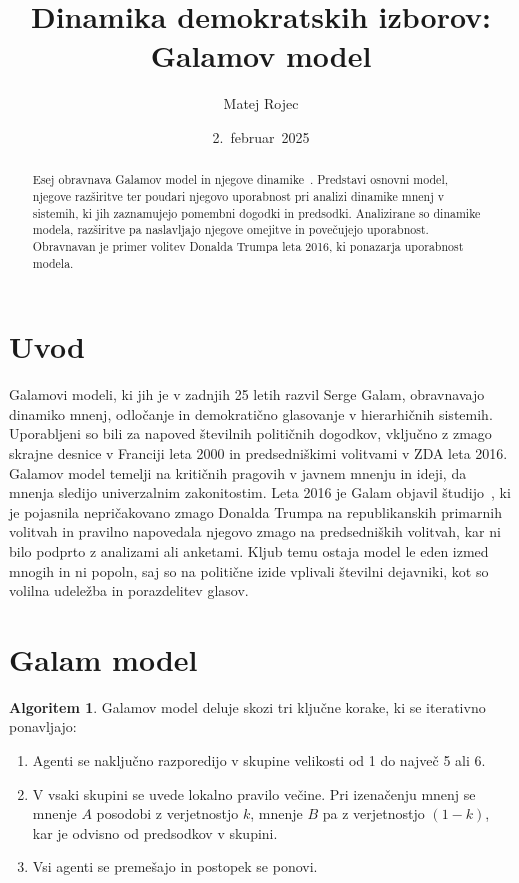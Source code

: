 \documentclass[a4paper,12pt]{article}
\theoremstyle{definition}
\newtheorem{algoritem}{Algoritem}
\begin{document}
\title{Dinamika demokratskih izborov: Galamov model}
\author{Matej Rojec}
\date{2.~februar~2025}

\maketitle

\begin{abstract}
Esej obravnava Galamov model in njegove dinamike~\cite{galam2015stubbornness,galam2016trump,galam2020tipping}. 
Predstavi osnovni model, njegove razširitve ter poudari njegovo uporabnost pri 
analizi dinamike mnenj v sistemih, ki jih zaznamujejo pomembni dogodki in predsodki. 
Analizirane so dinamike modela, razširitve pa naslavljajo njegove omejitve in 
povečujejo uporabnost. Obravnavan je primer volitev Donalda Trumpa leta 2016, 
ki ponazarja uporabnost modela.
\end{abstract}

\section{Uvod}

Galamovi modeli, ki jih je v zadnjih 25 letih razvil Serge Galam, obravnavajo dinamiko mnenj, 
odločanje in demokratično glasovanje v hierarhičnih sistemih. 
Uporabljeni so bili za napoved številnih političnih dogodkov, vključno z zmago skrajne desnice 
v Franciji leta 2000 in predsedniškimi volitvami v ZDA leta 2016. Galamov model temelji na 
kritičnih pragovih v javnem mnenju in ideji, da mnenja sledijo univerzalnim zakonitostim. 
Leta 2016 je Galam objavil študijo~\cite{galam2016trump}, ki je pojasnila nepričakovano zmago Donalda Trumpa na 
republikanskih primarnih volitvah in pravilno napovedala njegovo zmago na predsedniških volitvah, 
kar ni bilo podprto z analizami ali anketami. 
Kljub temu ostaja model le eden izmed mnogih in ni popoln, saj so na politične izide vplivali 
številni dejavniki, kot so volilna udeležba in porazdelitev glasov.

\section{Galam model}

\begin{algoritem}
Galamov model deluje skozi tri ključne korake, ki se iterativno ponavljajo:   

\begin{enumerate}
\item Agenti se naključno razporedijo v skupine velikosti od 1 do največ 5 ali 6.

\item V vsaki skupini se uvede lokalno pravilo večine. Pri izenačenju mnenj se mnenje $A$ posodobi z 
verjetnostjo $k$, mnenje $B$ pa z verjetnostjo $(1-k)$, kar je odvisno od predsodkov v skupini.

\item Vsi agenti se premešajo in postopek se ponovi.
\end{enumerate}
\end{algoritem}
\end{document}
